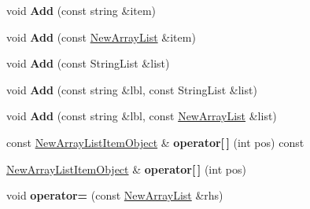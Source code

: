 \begin{DoxyCompactItemize}
\item 
\hypertarget{classrrc_1_1_new_array_list_a7526bc6f2a725951f740c5715ad20ec9}{void {\bfseries Add} (const string \&item)}\label{classrrc_1_1_new_array_list_a7526bc6f2a725951f740c5715ad20ec9}

\item 
\hypertarget{classrrc_1_1_new_array_list_ae998943a4a4e12636ac72b25ed85998a}{void {\bfseries Add} (const \hyperlink{classrrc_1_1_new_array_list}{New\-Array\-List} \&item)}\label{classrrc_1_1_new_array_list_ae998943a4a4e12636ac72b25ed85998a}

\item 
\hypertarget{classrrc_1_1_new_array_list_ab74dfcee4c99721f851ed47328d84efc}{void {\bfseries Add} (const String\-List \&list)}\label{classrrc_1_1_new_array_list_ab74dfcee4c99721f851ed47328d84efc}

\item 
\hypertarget{classrrc_1_1_new_array_list_a0e26c53f3abed565e238ad8f98e0e8f9}{void {\bfseries Add} (const string \&lbl, const String\-List \&list)}\label{classrrc_1_1_new_array_list_a0e26c53f3abed565e238ad8f98e0e8f9}

\item 
\hypertarget{classrrc_1_1_new_array_list_af011ec118b17a1a475c7d10f27fbc87f}{void {\bfseries Add} (const string \&lbl, const \hyperlink{classrrc_1_1_new_array_list}{New\-Array\-List} \&list)}\label{classrrc_1_1_new_array_list_af011ec118b17a1a475c7d10f27fbc87f}

\item 
\hypertarget{classrrc_1_1_new_array_list_a7edcb07552fc0d245644437efd408bb1}{const \hyperlink{classrrc_1_1_new_array_list_item_object}{New\-Array\-List\-Item\-Object} \& {\bfseries operator\mbox{[}$\,$\mbox{]}} (int pos) const }\label{classrrc_1_1_new_array_list_a7edcb07552fc0d245644437efd408bb1}

\item 
\hypertarget{classrrc_1_1_new_array_list_a1aeabde991c11fe350c94c9ddb57fc48}{\hyperlink{classrrc_1_1_new_array_list_item_object}{New\-Array\-List\-Item\-Object} \& {\bfseries operator\mbox{[}$\,$\mbox{]}} (int pos)}\label{classrrc_1_1_new_array_list_a1aeabde991c11fe350c94c9ddb57fc48}

\item 
\hypertarget{classrrc_1_1_new_array_list_ab6574566930399a176bdb293e6e5a62e}{void {\bfseries operator=} (const \hyperlink{classrrc_1_1_new_array_list}{New\-Array\-List} \&rhs)}\label{classrrc_1_1_new_array_list_ab6574566930399a176bdb293e6e5a62e}


\end{DoxyCompactItemize}

